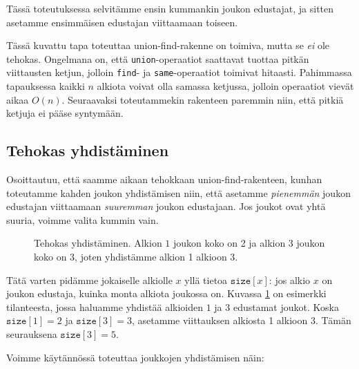 Tässä toteutuksessa selvitämme ensin kummankin joukon edustajat,
ja sitten asetamme ensimmäisen edustajan viittaamaan toiseen.

Tässä kuvattu tapa toteuttaa union-find-rakenne on toimiva,
mutta se \emph{ei} ole tehokas.
Ongelmana on, että \texttt{union}-operaatiot saattavat tuottaa
pitkän viittausten ketjun, jolloin \texttt{find}- ja
\texttt{same}-operaatiot toimivat hitaasti.
Pahimmassa tapauksessa kaikki $n$ alkiota voivat olla
samassa ketjussa, jolloin operaatiot vievät aikaa $O(n)$.
Seuraavaksi toteutammekin rakenteen paremmin niin,
että pitkiä ketjuja ei pääse syntymään.

\subsection{Tehokas yhdistäminen}

Osoittautuu, että saamme aikaan tehokkaan union-find-rakenteen,
kunhan toteutamme kahden joukon yhdistämisen niin,
että asetamme \emph{pienemmän} joukon edustajan viittaamaan
\emph{suuremman} joukon edustajaan. Jos joukot ovat yhtä suuria,
voimme valita kummin vain.

\begin{figure}
\center
\begin{center}
\end{center}
\caption{Tehokas yhdistäminen. Alkion $1$ joukon koko on 2
ja alkion $3$ joukon koko on 3,
joten yhdistämme alkion 1 alkioon 3.}
\label{fig:tehyhd}
\end{figure}


Tätä varten pidämme jokaiselle alkiolle $x$ yllä tietoa
$\texttt{size}[x]$: jos alkio $x$ on joukon edustaja,
kuinka monta alkiota joukossa on.
Kuvassa \ref{fig:tehyhd} on esimerkki tilanteesta,
jossa haluamme yhdistää alkioiden $1$ ja $3$ edustamat joukot.
Koska $\texttt{size}[1]=2$ ja $\texttt{size}[3]=3$,
asetamme viittauksen alkiosta 1 alkioon 3.
Tämän seurauksena $\texttt{size}[3]=5$.

Voimme käytännössä toteuttaa joukkojen yhdistämisen näin:


